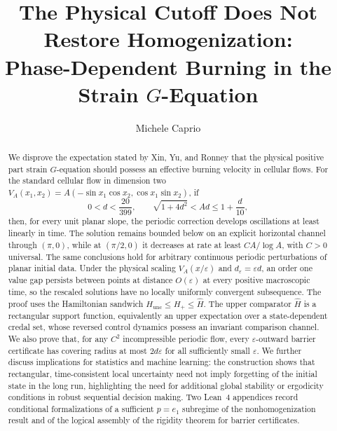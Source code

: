 \documentclass[11pt,reqno,noamsfonts]{amsart}
\title[The Physical Cutoff Does Not Restore Homogenization]
{The Physical Cutoff Does Not Restore Homogenization:\\
Phase-Dependent Burning in the Strain $G$-Equation}
\author{Michele Caprio}
\date{}
\theoremstyle{definition}
\theoremstyle{remark}
\begin{document}
\begin{abstract}
We disprove the expectation stated by Xin, Yu, and Ronney that the
physical positive part strain $G$-equation should possess an effective
burning velocity in cellular flows.  For the standard cellular flow in
dimension two
  $V_A(x_1,x_2)
  =A(-\sin x_1\cos x_2,\cos x_1\sin x_2)$,
if
\[
  0<d<\frac{20}{399},
  \qquad
  \sqrt{1+4d^2}<Ad\le1+\frac d{10},
\]
then, for every unit planar slope, the periodic correction develops
oscillations at least linearly in time.  The solution remains bounded
below on an explicit horizontal channel through $(\pi,0)$, while at
$(\pi/2,0)$ it decreases at rate at least $CA/\log A$, with $C>0$
universal.  The same conclusions hold for arbitrary continuous periodic
perturbations of planar initial data.  Under the physical scaling
$V_A(x/\varepsilon)$ and $d_\varepsilon=\varepsilon d$, an order one
value gap persists between points at distance $O(\varepsilon)$ at every
positive macroscopic time, so the rescaled solutions have no locally
uniformly convergent subsequence.
The proof uses the Hamiltonian sandwich
$H_{\mathrm{unc}}\le H_+\le\widehat H$.  The upper comparator $\widehat H$ is a
rectangular support function, equivalently an upper expectation over a
state-dependent credal set, whose reversed control dynamics possess an
invariant comparison channel.  We also prove that, for any $C^2$
incompressible periodic flow, every $\varepsilon$-outward barrier
certificate has covering radius at most $2d\varepsilon$ for all
sufficiently small $\varepsilon$.  We further discuss implications for
statistics and machine learning: the construction shows that
rectangular, time-consistent local uncertainty need not imply forgetting
of the initial state in the long run, highlighting the need for
additional global stability or ergodicity conditions in robust
sequential decision making.  Two Lean~4 appendices record conditional
formalizations of a sufficient $p=e_1$ subregime of the nonhomogenization result
and of the logical assembly of the rigidity theorem for barrier
certificates.
\end{abstract}


\maketitle

\begingroup
\setcounter{tocdepth}{1}
\renewcommand{\numberline}[1]{}
\tableofcontents
\endgroup
\end{document}
